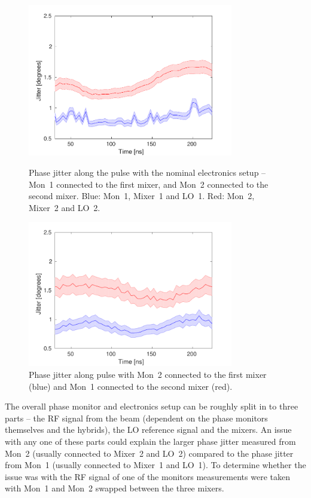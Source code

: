\begin{figure}
  \centering
  \includegraphics[width=0.8\textwidth]{Figures/phaseMons/Mix1Mon1_Mix2Mon2}
  \caption{Phase jitter along the pulse with the nominal electronics setup -- Mon~1 connected to the first mixer, and Mon~2 connected to the second mixer. Blue: Mon~1, Mixer~1 and LO~1. Red: Mon~2, Mixer~2 and LO~2.}
  \label{f:Mix1Mon1_Mix2Mon2}
  \includegraphics[width=0.8\textwidth]{Figures/phaseMons/Mix1Mon2_Mix2Mon1}
  \caption{Phase jitter along pulse with Mon~2 connected to the first mixer (blue) and Mon~1 connected to the second mixer (red).}
  \label{f:Mix1Mon2_Mix2Mon1}
\end{figure}

The overall phase monitor and electronics setup can be roughly split in to three parts -- the RF signal from the beam (dependent on the phase monitors themselves and the hybrids), the LO reference signal and the mixers. An issue with any one of these parts could explain the larger phase jitter measured from Mon~2 (usually connected to Mixer~2 and LO~2) compared to the phase jitter from Mon~1 (usually connected to Mixer~1 and LO~1). To determine whether the issue was with the RF signal of one of the monitors measurements were taken with Mon~1 and Mon~2 swapped between the three mixers.

